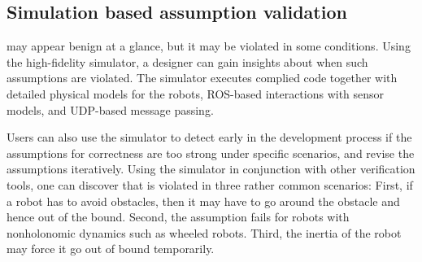 \subsection{Simulation based assumption validation}

 may appear benign at a glance, but it may be violated in some conditions. Using the high-fidelity \lgname simulator, a designer can gain insights about when such assumptions are violated. The simulator executes complied \lgname code together with detailed physical  models for the robots, ROS-based interactions with sensor models, and UDP-based message passing.

Users can also use the simulator to detect early in the development process if the assumptions for correctness are too strong under specific scenarios, and revise the assumptions iteratively. Using the \lgname simulator in conjunction with other verification tools, one can discover that  is violated in three rather common scenarios:
First, if a robot has to avoid obstacles,
then it may have to go around the obstacle and hence out of the bound.
Second, the assumption fails for robots with nonholonomic dynamics such as wheeled robots.
Third, the inertia of the robot may force it go out of bound temporarily.
